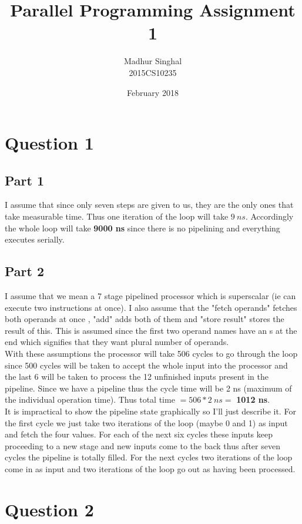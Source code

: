 \documentclass[11pt,a4paper]{article}
\author{Madhur Singhal\\2015CS10235 }
\date{February 2018}
\title{Parallel Programming Assignment 1}
\begin{document}
\maketitle
\section{Question 1}

\subsection{Part 1}
I assume that since only seven steps are given to us, they are the only ones that take measurable time. Thus one iteration of the loop will take $9\:ns$. Accordingly the whole loop will take \textbf{9000 ns} since there is no pipelining and everything executes serially.
\subsection{Part 2}
I assume that we mean a 7 stage pipelined processor which is superscalar (ie can execute two instructions at once). I also assume that the "fetch operands" fetches both operands at once , "add" adds both of them and "store result" stores the result of this. This is assumed since the first two operand names have an s at the end which signifies that they want plural number of operands.\\
With these assumptions the processor will take 506 cycles to go through the loop since 500 cycles will be taken to accept the whole input into the processor and the last 6 will be taken to process the 12 unfinished inputs present in the pipeline. Since we have a pipeline thus the cycle time will be 2 ns (maximum of the individual operation time). Thus total time $= 506*2\: ns =$ \textbf{1012 ns}.\\
It is impractical to show the pipeline state graphically so I'll just describe it. For the first cycle we just take two iterations of the loop (maybe 0 and 1) as input and fetch the four values. For each of the next six cycles these inputs keep proceeding to a new stage and new inputs come to the back thus after seven cycles the pipeline is totally filled. For the next cycles two iterations of the loop come in as input and two iterations of the loop go out as having been processed.


\section{Question 2}
\end{document}
